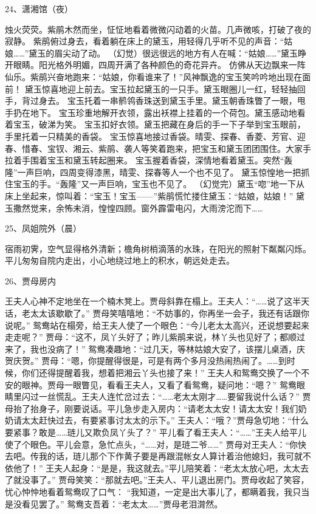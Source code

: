 24、潇湘馆（夜）\par 
烛火荧荧。紫鹃木然而坐，怔怔地看着微微闪动着的火苗。几声微咳，打破了夜的寂静。 
紫鹃俯过身去，看着躺在床上的黛玉，用轻得几乎听不见的声音：“姑娘……”黛玉的眉尖动了动。 
（幻觉）很远很远的地方有人在喊：“姑娘……”黛玉睁开眼睛。阳光格外明媚，四周开满了各种颜色的奇花异卉。 
仿佛从天边飘来一阵仙乐。紫鹃兴奋地跑来：“姑娘，你看谁来了！”风神飘逸的宝玉笑吟吟地出现在面前！ 
黛玉惊喜地迎上前去。宝玉拉起黛玉的一只手。黛玉眼圈儿一红，轻轻抽回手，背过身去。 
宝玉托着一串鹡鸰香珠送到黛玉手里。黛玉朝香珠瞥了一眼，甩手扔在地下。 
宝玉珍重地解开衣领，露出袄襟上挂着的一个荷包。黛玉感动地看着宝玉，破涕为笑。 
宝玉扣好衣领。黛玉把藏在身后的手一下子举到宝玉眼前，手里托着一只精美的香袋。 
宝玉惊喜地接过香袋。晴雯、探春、香菱、芳官、迎春、惜春、宝钗、湘云、紫鹃、袭人等笑着跑来，把宝玉和黛玉团团围住。大家手拉着手围着宝玉和黛玉转起圈来。 
宝玉握着香袋，深情地看着黛玉。突然“轰隆”一声巨响，四周变得漆黑，晴雯、探春等人一个也不见了。
黛玉惊惶地一把抓住宝玉的手。“轰隆”又一声巨响，宝玉也不见了。 
（幻觉完）黛玉“唿”地一下从床上坐起来，惊叫着：“宝玉！宝玉——”紫鹃慌忙搂住黛玉：“姑娘，姑娘！” 
黛玉撒然觉来，余怖未消，惶惶四顾。窗外霹雷电闪，大雨滂沱而下…… 

25、凤姐院外（晨）\par 
宿雨初霁，空气显得格外清新；檐角树梢滴落的水珠，在阳光的照射下粼粼闪烁。
平儿匆匆自院内走出，小心地绕过地上的积水，朝远处走去。 

26、贾母房内\par
王夫人心神不定地坐在一个楠木凳上。贾母斜靠在榻上。王夫人：“……说了这半天话，老太太该歇歇了。” 
贾母笑嘻嘻地：“不妨事的，你再坐一会子，我还有话跟你说呢。” 
鸳鸯站在榻旁，给王夫人使了一个眼色：“今儿老太太高兴，还说想要起来走走呢？” 
贾母：“这不，凤丫头好了；昨儿紫鹃来说，林丫头也见好了；都顺过来了，我也没病了！” 
鸳鸯凑趣地：“过几天，等林姑娘大安了，该摆儿桌酒，庆贺庆贺。” 
贾母：“嗯，你提醒得很是，可是有两个多月没热闹热闹了。……到时候，你们还得提醒着我，想着把湘云丫头也接了来！”
王夫人和鸳鸯交换了一个不安的眼神。贾母一眼瞥见，看看王夫人，又看了看鸳鸯，疑问地：“嗯？” 
鸳鸯眼睛里闪过一丝慌乱。王夫人连忙岔过去：“……老太太刚才……要留我说什么话？” 
贾母抬了抬身子，刚要说话。平儿急步走入房内：“请老太太安！请太太安！我们奶奶请太太赶快过去，有要紧事讨太太的示下。”
王夫人：“哦？”贾母急切地：“什么要紧事？敢是……琏儿又欺负凤丫头了？” 
平儿看了看王夫人：“……”王夫人给平儿使了个眼色。平儿会意，急忙点头，“……对，是琏二爷……” 
贾母对王夫人：“你快去吧。传我的话，琏儿那个下作黄子要是再跟混帐女人算计着治他媳妇，我可就不依他了！”
王夫人起身：“是是，我这就去。”平儿陪笑着：“老太太放心吧，太太去了就没事了。” 
贾母笑笑：“那就去吧。”王夫人、平儿退出房门。贾母收起了笑容，忧心忡忡地看着鸳鸯叹了口气：
“我知道，一定是出大事儿了，都瞒着我，我只当是没看见罢了。” 鸳鸯支吾着：“老太太……”贾母老泪潸然。

